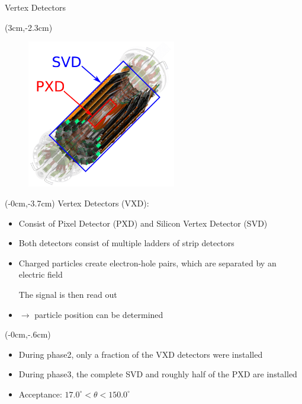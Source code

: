 \documentclass[8pt]{beamer}
\begin{document}
\begin{frame}{Vertex Detectors}
	
	
		\begin{textblock*}{10cm}(3cm,-2.3cm)
		\begin{figure}
			\includegraphics[width=6.5cm]{VBilder/PXD_SVD}
		\end{figure}
		
		
	\end{textblock*}
	
	
	\begin{textblock*}{10cm}(-0cm,-3.7cm)
		Vertex Detectors (VXD):		
			\begin{itemize}
				\item Consist of Pixel Detector (PXD) and Silicon Vertex Detector (SVD)
				\item Both detectors consist of multiple ladders of strip detectors
				\item Charged particles create electron-hole pairs, which are separated by an electric field
				
				The signal is then read out
				\item[] $\rightarrow$ particle position can be determined
			\end{itemize}
		\end{textblock*}
	\begin{textblock*}{5cm}(-0cm,-.6cm)
		\begin{itemize}
	
				\item During phase2, only a fraction of the VXD detectors were installed
				\item During phase3, the complete SVD and roughly half of the PXD are installed
				\item Acceptance: $17.0^{\circ} < \theta < 150.0^{\circ}$ 
			\end{itemize}
		



	\end{textblock*}
	
	

	
	
	
\end{frame}
\end{document}
